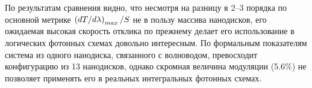 По результатам сравнения видно, что несмотря на разницу в 2--3 порядка по основной метрике $\left( dT/d\lambda \right)_{max}/S$ не в пользу массива нанодисков, его ожидаемая высокая скорость отклика по прежнему делает его использование в логических фотонных схемах довольно интересным. По формальным показателям система из одного нанодиска, связанного с волноводом, превосходит конфигурацию из 13 нанодисков, однако скромная величина модуляции (5.6\%) не позволяет применять его в реальных интегральных фотонных схемах.